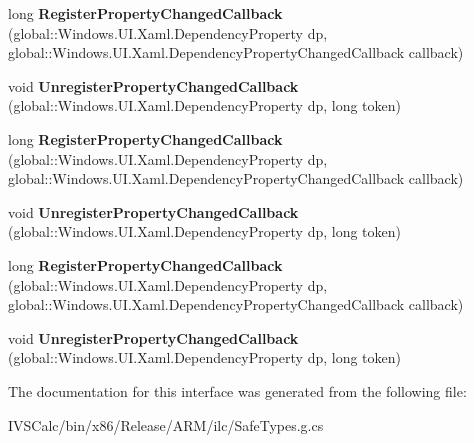 \begin{DoxyCompactItemize}
long {\bfseries Register\+Property\+Changed\+Callback} (global\+::\+Windows.\+U\+I.\+Xaml.\+Dependency\+Property dp, global\+::\+Windows.\+U\+I.\+Xaml.\+Dependency\+Property\+Changed\+Callback callback)
\item 
\mbox{\label{interface_windows_1_1_u_i_1_1_xaml_1_1_i_dependency_object2_a6201834ef34b95fe7fcf094389da6edf}} 
void {\bfseries Unregister\+Property\+Changed\+Callback} (global\+::\+Windows.\+U\+I.\+Xaml.\+Dependency\+Property dp, long token)
\item 
\mbox{\label{interface_windows_1_1_u_i_1_1_xaml_1_1_i_dependency_object2_a282537e2e0f85c3c33e27bd45967c7bf}} 
long {\bfseries Register\+Property\+Changed\+Callback} (global\+::\+Windows.\+U\+I.\+Xaml.\+Dependency\+Property dp, global\+::\+Windows.\+U\+I.\+Xaml.\+Dependency\+Property\+Changed\+Callback callback)
\item 
\mbox{\label{interface_windows_1_1_u_i_1_1_xaml_1_1_i_dependency_object2_a6201834ef34b95fe7fcf094389da6edf}} 
void {\bfseries Unregister\+Property\+Changed\+Callback} (global\+::\+Windows.\+U\+I.\+Xaml.\+Dependency\+Property dp, long token)
\item 
\mbox{\label{interface_windows_1_1_u_i_1_1_xaml_1_1_i_dependency_object2_a282537e2e0f85c3c33e27bd45967c7bf}} 
long {\bfseries Register\+Property\+Changed\+Callback} (global\+::\+Windows.\+U\+I.\+Xaml.\+Dependency\+Property dp, global\+::\+Windows.\+U\+I.\+Xaml.\+Dependency\+Property\+Changed\+Callback callback)
\item 
\mbox{\label{interface_windows_1_1_u_i_1_1_xaml_1_1_i_dependency_object2_a6201834ef34b95fe7fcf094389da6edf}} 
void {\bfseries Unregister\+Property\+Changed\+Callback} (global\+::\+Windows.\+U\+I.\+Xaml.\+Dependency\+Property dp, long token)
\end{DoxyCompactItemize}


The documentation for this interface was generated from the following file\+:\begin{DoxyCompactItemize}
\item 
I\+V\+S\+Calc/bin/x86/\+Release/\+A\+R\+M/ilc/Safe\+Types.\+g.\+cs\end{DoxyCompactItemize}
